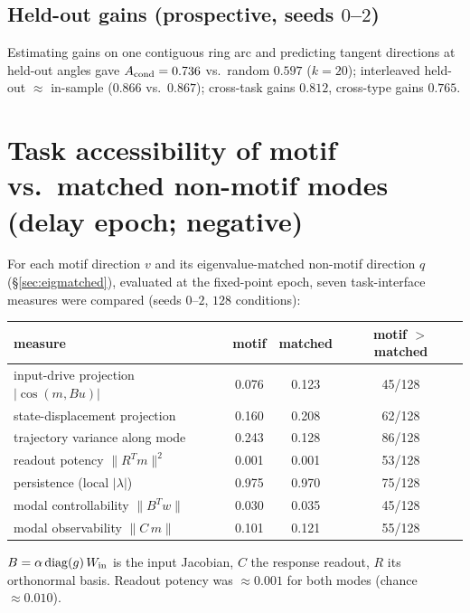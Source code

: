 \documentclass[11pt]{article}
\begin{document}
\subsection{Held-out gains (prospective, seeds $0$--$2$)}
Estimating gains on one contiguous ring arc and predicting tangent directions at held-out angles
gave $A_{\rm cond}=0.736$ vs.\ random $0.597$ ($k=20$); interleaved held-out $\approx$ in-sample
($0.866$ vs.\ $0.867$); cross-task gains $0.812$, cross-type gains $0.765$.

\section{Task accessibility of motif vs.\ matched non-motif modes (delay epoch; negative)}
\label{sec:access}
For each motif direction $v$ and its eigenvalue-matched non-motif direction $q$
(\S\ref{sec:eigmatched}), evaluated at the fixed-point epoch, seven task-interface measures were
compared (seeds $0$--$2$, $128$ conditions):
\begin{center}\small
\begin{tabular}{lccc}
\toprule
measure & motif & matched & motif $>$ matched \\
\midrule
input-drive projection $|\cos(m,Bu)|$        & 0.076 & 0.123 & 45/128 \\
state-displacement projection                 & 0.160 & 0.208 & 62/128 \\
trajectory variance along mode                & 0.243 & 0.128 & 86/128 \\
readout potency $\lVert R^{T}m\rVert^{2}$     & 0.001 & 0.001 & 53/128 \\
persistence (local $|\lambda|$)               & 0.975 & 0.970 & 75/128 \\
modal controllability $\lVert B^{T}w\rVert$   & 0.030 & 0.035 & 45/128 \\
modal observability $\lVert C\,m\rVert$       & 0.101 & 0.121 & 55/128 \\
\bottomrule
\end{tabular}
\end{center}
$B=\alpha\,\mathrm{diag}(g)\,W_{\rm in}$ is the input Jacobian, $C$ the response readout, $R$ its
orthonormal basis. Readout potency was $\approx0.001$ for both modes (chance $\approx0.010$).
\end{document}
